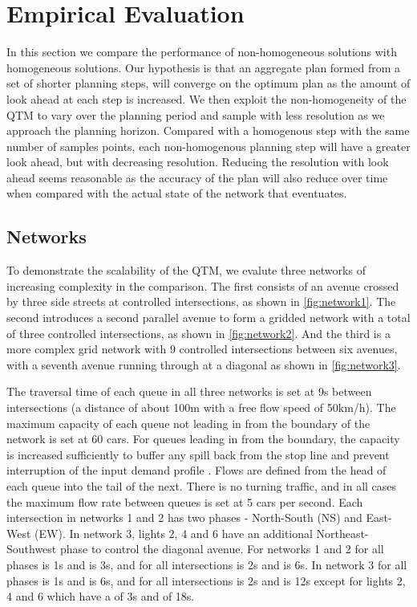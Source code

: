 
\section{Empirical Evaluation}
  
In this section we compare the performance of non-homogeneous solutions with homogeneous solutions. Our hypothesis is that an aggregate plan formed from a set of shorter planning steps, will converge on the optimum plan as the amount of look ahead at each step is increased. We then exploit the non-homogeneity of the QTM to vary \DT[] over the planning period and sample with less resolution as we approach the planning horizon. Compared with a homogenous step with the same number of samples points, each non-homogenous planning step will have a greater look ahead, but with decreasing resolution. Reducing the resolution with look ahead seems reasonable as the accuracy of the plan will also reduce over time when compared with the actual state of the network that eventuates. 

\subsection{Networks}

To demonstrate the scalability of the QTM, we evalute three networks of increasing complexity
in the comparison. The first consists of an avenue crossed by three 
side streets at controlled intersections, as shown in \cref{fig:network1}. The second introduces a second
parallel avenue to form a gridded network with a total of three controlled
intersections, as shown in \cref{fig:network2}. And the third is a more complex
grid network with 9 controlled intersections between six avenues, with a seventh avenue running through at a diagonal as shown in \cref{fig:network3}.

The traversal time of each queue in all three networks is set at 9s 
between intersections (a distance of about 100m with a free flow speed of
50km/h). The maximum capacity of each queue not leading in from the boundary of the network
is set at 60 cars. For queues leading in from the boundary, the capacity is increased sufficiently
to buffer any spill back from the stop line and prevent interruption of the input demand profile .
Flows are defined from the head of each queue into the
tail of the next. There is no turning traffic, and in all cases the
maximum flow rate between queues is set at 5 cars per second. Each intersection in networks 1 and 2 has
two phases - North-South (NS) and East-West (EW). In network 3, lights 2, 4 and 6 have an
additional Northeast-Southwest phase to control the diagonal avenue. For networks 1 and 2 for all phases \PTMIN{}{} is 1s
and \PTMAX{}{} is 3s, and for all intersections \CTMIN{}{} is 2s and \CTMAX{}{} is 6s. In network 3 for all phases \PTMIN{}{} is 1s
and \PTMAX{}{} is 6s, and for all intersections \CTMIN{}{} is 2s and \CTMAX{}{} is 12s except for lights 2, 4 and 6 which have a \CTMIN{}{} of 3s and \CTMAX{}{} of 18s.


